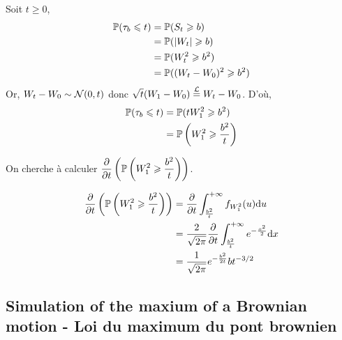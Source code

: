 Soit $t \geq 0$,
\begin{equation*}
\begin{split}
  \P(\tau_b \leq t) &= \P(\st \geq b) \\
  &= \P(\vert \wt \vert \geq b) \\
  &= \P(\wt^2 \geq b^2) \\
  &= \P((\wt-W_0)^2 \geq b^2) 
\end{split}
\end{equation*}
Or, $\wt - W_0 \sim \Normale(0,t)$ donc $\sqrt{t}(W_1 - W_0) \overset{\mathcal{L}}{=} \wt - W_0$.
D'où,
\begin{equation*}
\begin{split}
  \P(\tau_b \leq t) &=  \P(t W_1^2 \geq b^2) \\
  &= \P\left(W_1^2 \geq \frac{b^2}{t}\right)
\end{split}
\end{equation*}

On cherche à calculer $\dps \frac{\partial}{\partial t}\left(\P\left(W_1^2 \geq \frac{b^2}{t} \right)\right)$.

\begin{equation*}
\begin{split}
  \frac{\partial}{\partial t}\left(\P\left(W_1^2 \geq \frac{b^2}{t} \right)\right) &= \frac{\partial}{\partial t} \int_{ \frac{b^2}{t}}^{+\infty} f_{W_1^2}(u) \der u \\
  &= \frac{2}{\sqrt{2\pi}} \frac{\partial}{\partial t} \int_{ \frac{b^2}{t}}^{+\infty} e^{- \frac{x^2}{2}} \der x \\
  &= \frac{1}{\sqrt{2\pi}} e^{ - \frac{b^2}{2t}} b t^{-3/2}
\end{split}
\end{equation*}

\subsection{Simulation of the maxium of a Brownian motion - Loi du maximum du pont brownien}
\renewcommand{\ws}{W_s}
\newcommand{\supu}{\sup_{0 \leq s \leq t}}

